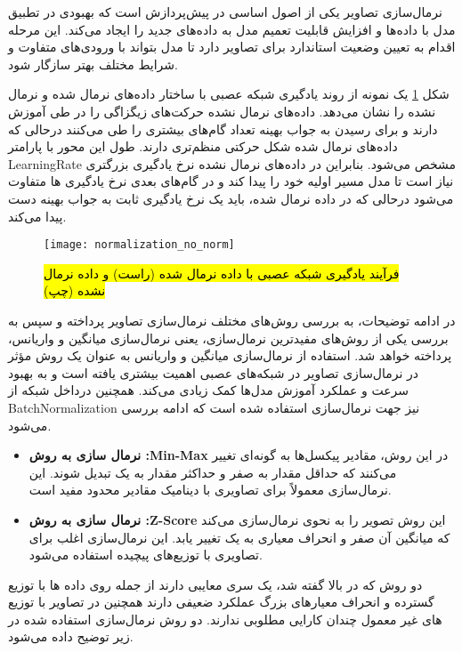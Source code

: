 نرمال‌سازی تصاویر یکی از اصول اساسی در پیش‌پردازش است که بهبودی در تطبیق مدل با داده‌ها و افزایش قابلیت تعمیم مدل به داده‌های جدید را ایجاد می‌کند. این مرحله اقدام به تعیین وضعیت استاندارد برای تصاویر دارد تا مدل بتواند با ورودی‌های متفاوت و شرایط مختلف بهتر سازگار شود.

شکل %
\ref{fig:normalization_no_norm}
یک نمونه از روند یادگیری شبکه عصبی با ساختار داده‌های نرمال‌ شده و نرمال نشده را نشان می‌دهد. داده‌های نرمال نشده حرکت‌های زیگزاگی را در طی آموزش دارند و برای رسیدن به جواب بهینه تعداد گام‌های بیشتری را طی می‌کنند درحالی که داده‌های نرمال شده شکل حرکتی منظم‌تری دارند. طول این محور با پارامتر %
\gls{LearningRate}
مشخص می‌شود. بنابراین در داده‌های نرمال نشده نرخ یادگیری بزرگتری نیاز است تا مدل مسیر اولیه خود را پیدا کند و در گام‌های بعدی نرخ یادگیری ها متفاوت می‌شود درحالی که در داده نرمال شده،‌ باید یک نرخ یادگیری ثابت به جواب بهینه دست پیدا می‌کند.

\begin{figure}[ht]
	\centerline{\texttt{[image: normalization\_no\_norm]}}
	\caption{\hl{
		فرآیند یادگیری شبکه عصبی با داده نرمال شده (راست) و داده نرمال نشده (چپ)
		}
	 \cite{Normal_not_Normal}
	}
	\label{fig:normalization_no_norm}
\end{figure}

در ادامه توضیحات، به بررسی روش‌های مختلف نرمال‌سازی تصاویر پرداخته و سپس به بررسی یکی از روش‌های مفید‌ترین نرمال‌سازی، یعنی  نرمال‌سازی میانگین و واریانس، پرداخته خواهد شد. استفاده از  نرمال‌سازی میانگین و واریانس به عنوان یک روش مؤثر در نرمال‌سازی تصاویر در شبکه‌های عصبی اهمیت بیشتری یافته است و به بهبود سرعت و عملکرد آموزش مدل‌ها کمک زیادی می‌کند. همچنین درداخل شبکه از %
\gls{BatchNormalization}
 نیز جهت نرمال‌سازی استفاده شده است که ادامه بررسی می‌شود.
\begin{itemize}
	\item \textbf{نرمال سازی به روش :Min-Max }
	در این روش، مقادیر پیکسل‌ها به گونه‌ای تغییر می‌کنند که حداقل مقدار به صفر و حداکثر مقدار به یک تبدیل شوند. این نرمال‌سازی معمولاً برای تصاویری با دینامیک مقادیر محدود مفید است.
	\item \textbf{نرمال سازی به روش :Z-Score }
	 این روش تصویر را به نحوی نرمال‌سازی می‌کند که میانگین آن صفر و انحراف معیاری به یک تغییر یابد. این نرمال‌سازی اغلب برای تصاویری با توزیع‌های پیچیده استفاده می‌شود.
\end{itemize}
دو روش که در بالا گفته شد، یک سری معایبی دارند از جمله روی داده ها با توزیع گسترده و انحراف معیار‌های بزرگ عملکرد ضعیفی دارند همچنین در تصاویر با توزیع های غیر معمول چندان کارایی مطلوبی ندارند. دو روش نرمال‌سازی استفاده شده در زیر توضیح داده می‌شود.

